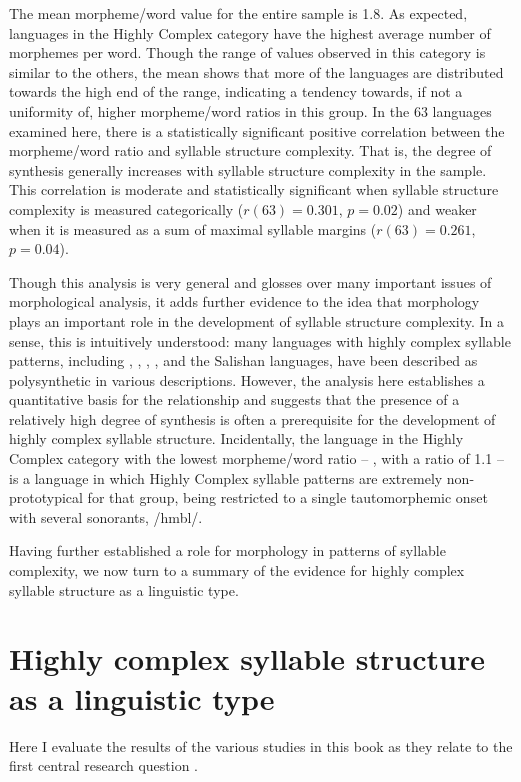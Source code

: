   The mean morpheme/word value for the entire sample is 1.8. As expected, languages in the Highly Complex category have the highest average number of morphemes per word. Though the range of values observed in this category is similar to the others, the mean shows that more of the languages are distributed towards the high end of the range, indicating a tendency towards, if not a uniformity of, higher morpheme/word ratios in this group. In the 63 languages examined here, there is a statistically significant positive correlation between the morpheme/word ratio and syllable structure complexity. That is, the degree of synthesis generally increases with syllable structure complexity in the sample. This correlation is moderate and statistically significant when syllable structure complexity is measured categorically ($r(63) = 0.301$, $p = 0.02$) and weaker when it is measured as a sum of maximal syllable margins ($r(63) = 0.261$, $p = 0.04$).

  Though this analysis is very general and glosses over many important issues of morphological analysis, it adds further evidence to the idea that morphology plays an important role in the development of syllable structure complexity. In a sense, this is intuitively understood: many languages with highly complex syllable patterns, including , , , , and the Salishan languages, have been described as polysynthetic in various descriptions. However, the analysis here establishes a quantitative basis for the relationship and suggests that the presence of a relatively high degree of synthesis is often a prerequisite for the development of highly complex syllable structure. Incidentally, the language in the Highly Complex category with the lowest morpheme/word ratio -- , with a ratio of 1.1 -- is a language in which Highly Complex syllable patterns are extremely non-prototypical for that group, being restricted to a single tautomorphemic onset with several sonorants, /hmbl/.

  Having further established a role for morphology in patterns of syllable complexity, we now turn to a summary of the evidence for highly complex syllable structure as a linguistic type.

\section{Highly complex syllable structure as a linguistic type}\label{sec:8.3}

  Here I evaluate the results of the various studies in this book as they relate to the first central research question .

